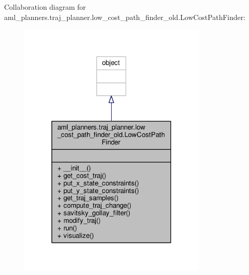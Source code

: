Collaboration diagram for aml\-\_\-planners.\-traj\-\_\-planner.\-low\-\_\-cost\-\_\-path\-\_\-finder\-\_\-old.\-Low\-Cost\-Path\-Finder\-:\nopagebreak
\begin{figure}[H]
\begin{center}
\leavevmode
\includegraphics[width=254pt]{classaml__planners_1_1traj__planner_1_1low__cost__path__finder__old_1_1_low_cost_path_finder__coll__graph}
\end{center}
\end{figure}
